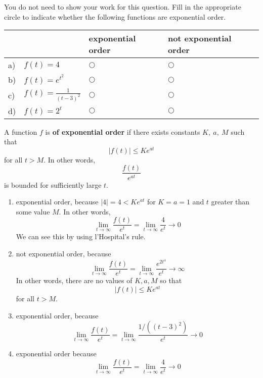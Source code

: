 \ifnum {}  
\question[2] You do not need to show your work for this question. Fill in the appropriate circle to indicate whether the following functions are exponential order. 
\vspace{-0.2cm}
\setlength{\extrarowheight}{0.10cm}
\begin{center}
\hspace{-.9cm}\begin{tabular}{ p{0.20cm} p{4cm} p{3.5cm} p{4cm} }
    & & exponential order &  not exponential order  \\[2pt] \hline 
    a) & $f(t) = 4$ & $\bigcirc$  & $\bigcirc$ \\[4pt]  
    b) & $f(t) = e^{t^2}$  & $\bigcirc$  & $\bigcirc$ \\[4pt] 
    c) & $f(t) = \frac{1}{(t-3)^2}$  & $\bigcirc$  & $\bigcirc$ \\[4pt]    
    d) & $f(t) = 2^t$  & $\bigcirc$  & $\bigcirc$ \\[4pt] 
    \hline
\end{tabular}
\end{center}
\setlength{\extrarowheight}{0.0cm}
\ifnum {} {\color{DarkBlue} A function 
$f$ is \textbf{of exponential order} if there exists constants $K, \ a, \ M$ such that $$  |f(t)| \leq Ke^{at}  $$ for all $t > M$. In other words, $$ \frac{f(t)}{e^{at}}  $$ is bounded for sufficiently large $t$.
\begin{enumerate}[label=(\alph*)]
    \item exponential order, because $|4| = 4 < Ke^{at}$ for $K=a=1$ and $t$ greater than some value $M$. In other words, $$\lim_{t\to \infty}\frac{f(t)}{e^t} = \lim_{t\to \infty}\frac{4}{e^t} \to 0$$ We can see this by using l'Hospital's rule. 
    \item not exponential order, because 
    $$\lim_{t\to \infty}\frac{f(t)}{e^t} = \lim_{t\to \infty}\frac{e^{2t^4}}{e^t} \to \infty$$ In other words, there are no values of $K,a,M$ so that $$  |f(t)| \leq Ke^{at}  $$ for all $t > M$.
    \item exponential order, because $$\lim_{t\to \infty}\frac{f(t)}{e^t} = \lim_{t\to \infty}\frac{1/((t-3)^2)}{e^t} \to 0$$    
    \item exponential order because $$\lim_{t\to \infty}\frac{f(t)}{e^t} = \lim_{t\to \infty}\frac{4}{e^t} \to 0$$
\end{enumerate}
}
\fi
\vspace{-6pt} 
\fi 


